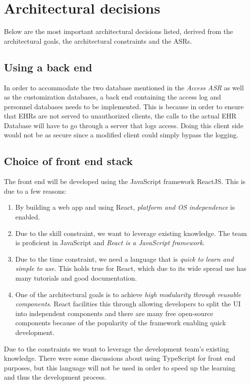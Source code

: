 \documentclass{article}
\begin{document}
\section{Architectural decisions}
Below are the most important architectural decisions listed, derived from the architectural goals, the architectural constraints and the ASRs.

\subsection{Using a back end}
In order to accommodate the two database mentioned in the \emph{Access ASR} as well as the customization databases, a back end containing the access log and personnel databases needs to be implemented. This is because in order to ensure that EHRs are not served to unauthorized clients, the calls to the actual EHR Database will have to go through a server that logs access. Doing this client side would not be as secure since a modified client could simply bypass the logging.

\subsection{Choice of front end stack}
The front end will be developed using the JavaScript framework ReactJS. This is due to a few reasons:

\begin{enumerate}[label=(\roman*)]
\item By building a web app and using React, \emph{platform and OS independence} is enabled.
\item Due to the skill constraint, we want to leverage existing knowledge. The team is proficient in JavaScript and \emph{React is a JavaScript framework}.
\item Due to the time constraint, we need a language that is \emph{quick to learn and simple to use}. This holds true for React, which due to its wide spread use has many tutorials and good documentation.
\item One of the architectural goals is to achieve \emph{high modularity through reusable components}. React facilities this through allowing developers to split the UI into independent components and there are many free open-source components because of the popularity of the framework enabling quick development.
\end{enumerate}

Due to the constraints we want to leverage the development team's existing knowledge. There were some discussions about using TypeScript for front end purposes, but this language will not be used in order to speed up the learning and thus the development process.
\end{document}
